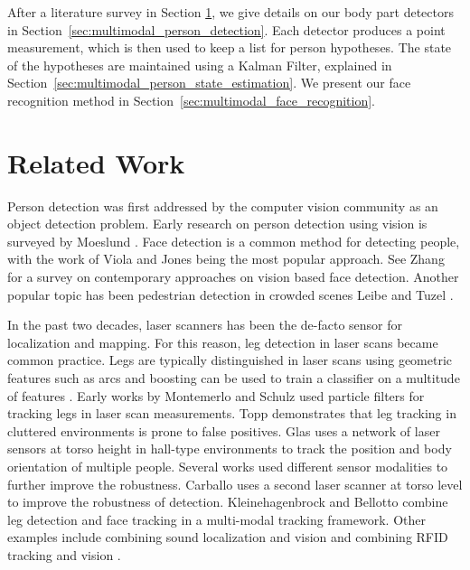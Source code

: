 After a literature survey in Section \ref{sec:multimodal_related_work}, we give details on our body part detectors in Section~\ref{sec:multimodal_person_detection}. Each detector produces a point measurement, which is then used to keep a list for person hypotheses. The state of the hypotheses are maintained using a Kalman Filter, explained in Section~\ref{sec:multimodal_person_state_estimation}. We present our face recognition method in Section~\ref{sec:multimodal_face_recognition}.

\section{Related Work}
\label{sec:multimodal_related_work}

Person detection was first addressed by the computer vision community as an object detection problem. Early research on person detection using vision is surveyed by Moeslund \cite{moeslund2001}. Face detection is a common method for detecting people, with the work of Viola and Jones \cite{viola2004robust} being the most popular approach. See Zhang \cite{zhang2010survey} for a survey on contemporary approaches on vision based face detection. Another popular topic has been pedestrian detection in crowded scenes Leibe \cite{leibe2005pedestrian} and Tuzel \cite{tuzel2007human}.

In the past two decades, laser scanners has been the de-facto sensor for localization and mapping. For this reason, leg detection in laser scans became common practice. Legs are typically distinguished in laser scans using geometric features such as arcs \cite{xavier2005fast} and boosting can be used to train a classifier on a multitude of features \cite{arras2007using}. Early works by Montemerlo \cite{montemerlo2002conditional} and Schulz \cite{schulz2001tracking} used particle filters for tracking legs in laser scan measurements. Topp \cite{topp2005tracking} demonstrates that leg tracking in cluttered environments is prone to false positives. Glas \cite{glas2009laser} uses a network of laser sensors at torso height in hall-type environments to track the position and body orientation of multiple people. Several works used different sensor modalities to further improve the robustness. Carballo \cite{Carballo2008} uses a second laser scanner at torso level to improve the robustness of detection. Kleinehagenbrock \cite{kleinehagenbrock2002person} and Bellotto \cite{bellotto2009multisensor} combine leg detection and face tracking in a multi-modal tracking framework. Other examples include combining sound localization and vision \cite{bernardin2007audio} and combining RFID tracking and vision \cite{germa2010vision}.

